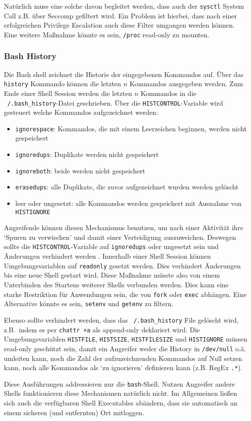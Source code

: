 Natürlich muss eine solche davon begleitet werden, dass auch der \texttt{sysctl} System Call z.B. über Seccomp gefiltert wird. Ein Problem ist hierbei, dass nach einer erfolgreichen Privilege Escalation auch diese Filter umgangen werden können. Eine weitere Maßnahme könnte es sein, \texttt{/proc} read-only zu mounten.

\subsubsection{Bash History}

Die Bash shell zeichnet die Historie der eingegebenen Kommandos auf. Über das \texttt{history} Kommando können die letzten $n$ Kommandos ausgegeben werden. Zum Ende einer Shell Session werden die letzten $n$ Kommandos in die \texttt{~/.bash\_history}-Datei geschrieben. Über die \texttt{HISTCONTROL}-Variable wird gesteuert welche Kommandos aufgezeichnet werden:

\begin{itemize}
    \item \texttt{ignorespace}: Kommandos, die mit einem Leerzeichen beginnen, werden nicht gespeichert
    \item \texttt{ignoredups}: Duplikate werden nicht gespeichert
    \item \texttt{ignoreboth}: beide werden nicht gespeichert
    \item \texttt{erasedups}: alle Duplikate, die zuvor aufgezeichnet wurden werden gelöscht
    \item leer oder ungesetzt: alle Kommandos werden gespeichert mit Ausnahme von \texttt{HISTIGNORE}
\end{itemize}

Angreifende können diesen Mechanismus benutzen, um nach einer Aktivität ihre `Spuren zu verwischen' und damit einer Verteidigung auszuweichen. Deswegen sollte die \texttt{HISTCONTROL}-Variable auf \texttt{ignoredups} oder ungesetzt sein und Änderungen verhindert werden \cite{attack-histcontrol}. Innerhalb einer Shell Session können Umgebungsvariablen auf \texttt{readonly} gesetzt werden. Dies verhindert Änderungen bis eine neue Shell gestart wird. Diese Maßnahme müsste also von einem
Unterbinden des Startens weiterer Shells verbunden werden. Dies kann eine starke Restriktion für Anwendungen sein, die von \texttt{fork} oder \texttt{exec} abhängen. Eine Alternative könnte es sein, \texttt{setenv} und \texttt{getenv} zu filtern.

Ebenso sollte verhindert werden, dass das \texttt{~/.bash\_history} File gelöscht wird, z.B.\ indem es per \texttt{chattr +a} als append-only deklariert wird. Die Umgebungsvariablen \texttt{HISTFILE}, \texttt{HISTSIZE}, \texttt{HISTFILESIZE} und \texttt{HISTIGNORE} müssen read-only geschützt sein, damit ein Angreifer weder die History in \texttt{/dev/null} o.ä. umleiten kann, noch die Zahl der aufzuzeichnenden Kommandos auf Null setzen kann, noch alle Kommandos als `zu
ignorieren' definieren kann (z.B. RegEx \texttt{.*}).

Diese Ausführungen addressieren nur die \texttt{bash}-Shell. Nutzen Angreifer andere Shells funktionieren diese Mechanismen natürlich nicht. Im Allgemeinen ließen sich auch die verfügbaren Shell Executables abändern, dass sie automatisch an einem sicheren (und entfernten) Ort mitloggen.

